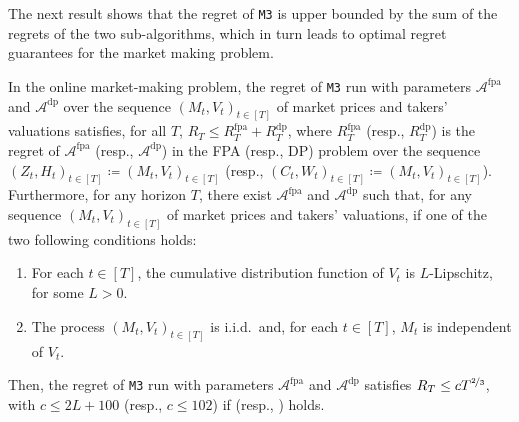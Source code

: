 \documentclass[final,12pt]{colt2025}
\newcommand{\cA}{\mathcal{A}}
\newcommand{\N}{\mathbb{N}}
\newcommand{\ceq}{\coloneqq}
\newcommand{\vin}{\texttt{M3}}
\newcommand{\itemm}{\item[$\bullet$]}
\newcommand{\Rfpa}{R^{\mathrm{fpa}}}
\newcommand{\Rdp}{R^{\mathrm{dp}}}
\newcommand{\nP}{M}
\newcommand{\nZ}{V}
\newcommand{\nV}{Z}
\newcommand{\nM}{H}
\newcommand{\nC}{C}
\newcommand{\nW}{W}
\begin{document}
The next result shows that the regret of \vin{} is upper bounded by the sum of the regrets of the two sub-algorithms, which in turn leads to optimal regret guarantees for the market making problem. 
\begin{theorem}\label{t:upper-bound-vin}
    In the online market-making problem, the regret of \vin{} run with parameters $\cA^{\mathrm{fpa}}$ and $\cA^{\mathrm{dp}}$ over the sequence $(\nP_t,\nZ_t)_{t \in [T]}$ of market prices and takers' valuations satisfies, for all $T$,
    $
        R_T
    \le
        \Rfpa_T + \Rdp_T
    $,
    where $\Rfpa_T$ (resp., $\Rdp_T$) is the regret of $\cA^{\mathrm{fpa}}$ (resp., $\cA^{\mathrm{dp}}$) in the FPA (resp., DP) problem over the sequence $(\nV_t,\nM_t)_{t\in[T]} \ceq (\nP_t,\nZ_t)_{t\in[T]}$ (resp., $(\nC_t,\nW_t)_{t\in[T]} \ceq (\nP_t,\nZ_t)_{t\in[T]}$).
%
    Furthermore, for any horizon $T$, there exist $\cA^{\mathrm{fpa}}$ and $\cA^{\mathrm{dp}}$ such that, for any sequence $(\nP_t,\nZ_t)_{t \in [T]}$ of market prices and takers' valuations, if one of the two following conditions holds:
    \begin{enumerate}
        \item \label{t:assOnePrime}
        For each $t \in [T]$, the cumulative distribution function of $\nZ_t$ is $L$-Lipschitz, for some $L>0$. 
        \item \label{t:assTwoPrime}
        The process $( \nP_t , \nZ_t )_{t \in [T]}$ is i.i.d.\ and, for each $t \in [T]$, $\nP_t$ is independent of $\nZ_t$.
    \end{enumerate}
    Then, the regret of \vin{} run with parameters $\cA^{\mathrm{fpa}}$ and $\cA^{\mathrm{dp}}$ satisfies
    $
        R_T
    \le
        c T^{\nicefrac{2}{3}}
    $,
    with $c \le 2L+100$ (resp., $c \le 102$) if  (resp., ) holds.
\end{theorem}
\end{document}
